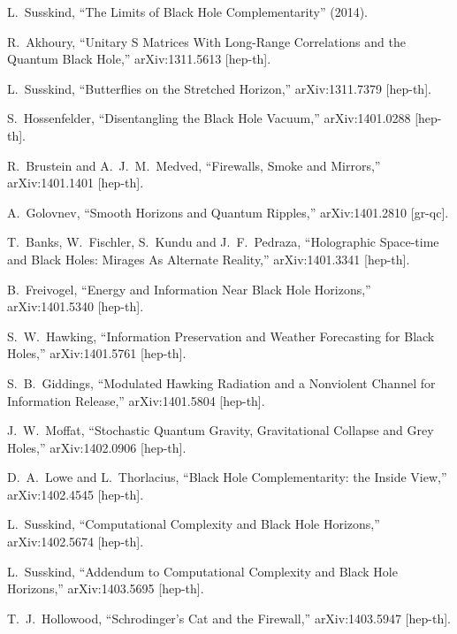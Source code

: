 \documentclass[12pt]{article}
\begin{document}
\begin{thebibliography}{99}
  L.~Susskind,
  ``The Limits of Black Hole Complementarity'' (2014).
  
  R.~Akhoury,
  ``Unitary S Matrices With Long-Range Correlations and the Quantum Black Hole,''
  arXiv:1311.5613 [hep-th].

  L.~Susskind,
  ``Butterflies on the Stretched Horizon,''
  arXiv:1311.7379 [hep-th].

  S.~Hossenfelder,
  ``Disentangling the Black Hole Vacuum,''
  arXiv:1401.0288 [hep-th].

  R.~Brustein and A.~J.~M.~Medved,
  ``Firewalls, Smoke and Mirrors,''
  arXiv:1401.1401 [hep-th].

  A.~Golovnev,
  ``Smooth Horizons and Quantum Ripples,''
  arXiv:1401.2810 [gr-qc].

  T.~Banks, W.~Fischler, S.~Kundu and J.~F.~Pedraza,
  ``Holographic Space-time and Black Holes: Mirages As Alternate Reality,''
  arXiv:1401.3341 [hep-th].

  B.~Freivogel,
  ``Energy and Information Near Black Hole Horizons,''
  arXiv:1401.5340 [hep-th].

  S.~W.~Hawking,
  ``Information Preservation and Weather Forecasting for Black Holes,''
  arXiv:1401.5761 [hep-th].

  S.~B.~Giddings,
  ``Modulated Hawking Radiation and a Nonviolent Channel for Information Release,''
  arXiv:1401.5804 [hep-th].

  J.~W.~Moffat,
  ``Stochastic Quantum Gravity, Gravitational Collapse and Grey Holes,''
  arXiv:1402.0906 [hep-th].

  D.~A.~Lowe and L.~Thorlacius,
  ``Black Hole Complementarity: the Inside View,''
  arXiv:1402.4545 [hep-th].

  L.~Susskind,
  ``Computational Complexity and Black Hole Horizons,''
  arXiv:1402.5674 [hep-th].

  L.~Susskind,
  ``Addendum to Computational Complexity and Black Hole Horizons,''
  arXiv:1403.5695 [hep-th].
  
  T.~J.~Hollowood,
  ``Schrodinger's Cat and the Firewall,''
  arXiv:1403.5947 [hep-th].


\end{thebibliography}
\end{document}

